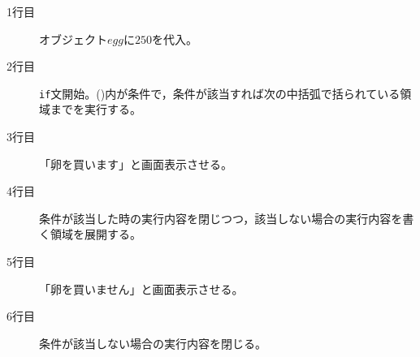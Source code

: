 \begin{description}
	\item[1行目] オブジェクト$egg$に$250$を代入。
	\item[2行目] \texttt{if}文開始。()内が条件で，条件が該当すれば次の中括弧で括られている領域までを実行する。
	\item[3行目] 「卵を買います」と画面表示させる。
	\item[4行目] 条件が該当した時の実行内容を閉じつつ，該当しない場合の実行内容を書く領域を展開する。
	\item[5行目] 「卵を買いません」と画面表示させる。
	\item[6行目] 条件が該当しない場合の実行内容を閉じる。
\end{description}
